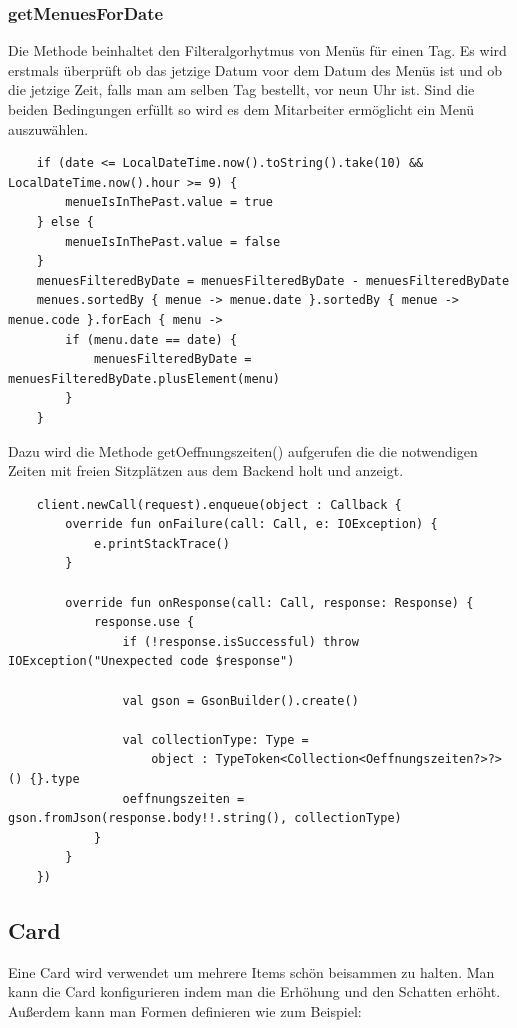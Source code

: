 \subsubsection{getMenuesForDate}
Die Methode beinhaltet den Filteralgorhytmus von Menüs für einen Tag. Es wird erstmals überprüft ob das jetzige Datum voor dem Datum des Menüs ist
und ob die jetzige Zeit, falls man am selben Tag bestellt, vor neun Uhr ist. Sind die beiden Bedingungen erfüllt so wird es dem Mitarbeiter ermöglicht ein Menü auszuwählen.

\begin{lstlisting}
    if (date <= LocalDateTime.now().toString().take(10) && LocalDateTime.now().hour >= 9) {
        menueIsInThePast.value = true
    } else {
        menueIsInThePast.value = false
    }
    menuesFilteredByDate = menuesFilteredByDate - menuesFilteredByDate
    menues.sortedBy { menue -> menue.date }.sortedBy { menue -> menue.code }.forEach { menu ->
        if (menu.date == date) {
            menuesFilteredByDate = menuesFilteredByDate.plusElement(menu)
        }
    }
\end{lstlisting}

Dazu wird die Methode getOeffnungszeiten() aufgerufen die die notwendigen Zeiten mit freien Sitzplätzen aus dem Backend holt und anzeigt.


\begin{lstlisting}
    client.newCall(request).enqueue(object : Callback {
        override fun onFailure(call: Call, e: IOException) {
            e.printStackTrace()
        }

        override fun onResponse(call: Call, response: Response) {
            response.use {
                if (!response.isSuccessful) throw IOException("Unexpected code $response")

                val gson = GsonBuilder().create()

                val collectionType: Type =
                    object : TypeToken<Collection<Oeffnungszeiten?>?>() {}.type
                oeffnungszeiten = gson.fromJson(response.body!!.string(), collectionType)
            }
        }
    })
\end{lstlisting}

\subsection{Card}
\cite{Card}
\author{Bozidar Spasenovic}

Eine Card wird verwendet um mehrere Items schön beisammen zu halten. Man kann die Card konfigurieren indem man die Erhöhung und den Schatten erhöht.
Außerdem kann man Formen definieren wie zum Beispiel:

